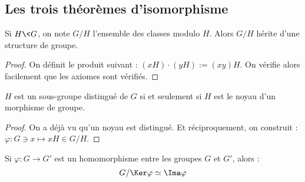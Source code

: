 \subsection[Théorèmes d'isomorphisme]{Les trois théorèmes d'isomorphisme}
\vspace{0.5em}


\begin{defi}
 
Si $H\<G$, on note $G/H$ l'ensemble des classes modulo $H$. Alors $G/H$ hérite
d'une structure de groupe.
\end{defi}

\begin{proof}
 On définit le produit suivant : $(xH)\cdotp (yH) := (x y)H$. On vérifie
alors facilement que les axiomes sont vérifiés.
\end{proof}

\begin{theo}
 
$H$ est un sous-groupe distingué de $G$ si et seulement si $H$ est le noyau
d'un morphisme de groupe.
\end{theo}

\begin{proof}
On a déjà vu qu'un noyau est distingué. Et réciproquement, on
construit :\\ $\varphi : G \owns x \mapsto xH \in G/H$.
\end{proof}

\begin{theo}

 Si $\varphi : G \longrightarrow G'$ est un homomorphisme entre les groupes $G$
et $G'$, alors :
\begin{displaymath} G/\Ker\varphi \simeq \Ima \varphi \end{displaymath}
\end{theo}

